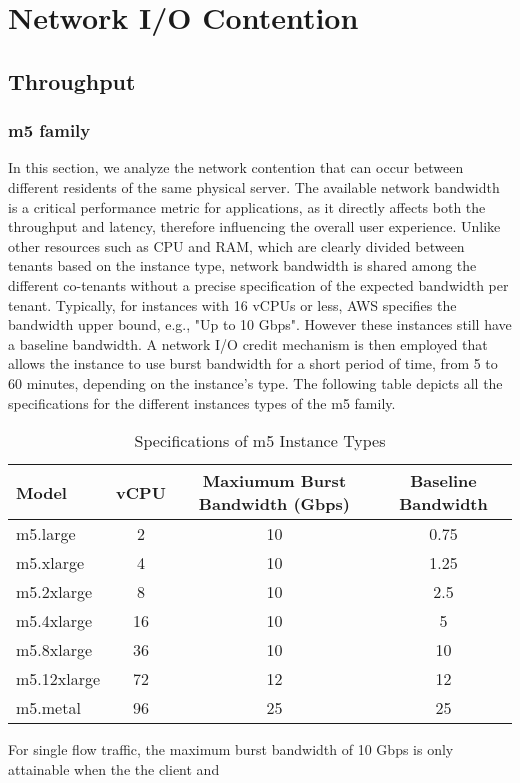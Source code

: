 \chapter{Network I/O Contention}\label{chapter:network}
\section{Throughput}
\subsection{m5 family}
In this section, we analyze the network contention that can occur between different residents of the same 
physical server. The available network bandwidth is a critical performance metric for applications, as it 
directly affects both the throughput and latency, therefore influencing the overall user experience. 
Unlike other resources such as CPU and RAM, which are clearly divided between tenants based on the instance 
type, network bandwidth is shared among the different co-tenants without a precise specification of the 
expected bandwidth per tenant. Typically, for instances with 16 vCPUs or less, AWS specifies the bandwidth 
upper bound, e.g., "Up to 10 Gbps". However these instances still have a baseline bandwidth. 
A network I/O credit mechanism is then employed that allows the instance to use burst bandwidth for a 
short period of time, from 5 to 60 minutes, depending on the instance's type. The following table 
depicts all the specifications for the different instances types of the m5 family.
\begin{table}[H]
\centering
\begin{tabular}{lccc}
\toprule
\textbf{Model} & \textbf{vCPU} & \textbf{Maxiumum Burst Bandwidth (Gbps)} & \textbf{Baseline Bandwidth} \\
\midrule
m5.large     & 2  & 10 & 0.75\\
m5.xlarge    & 4  & 10 & 1.25\\
m5.2xlarge   & 8  & 10 & 2.5\\
m5.4xlarge   & 16 & 10 & 5\\
m5.8xlarge   & 36 & 10 & 10\\
m5.12xlarge  & 72 & 12 & 12\\
m5.metal     & 96 & 25 & 25 \\
\bottomrule
\end{tabular}
\caption{Specifications of m5 Instance Types}
\end{table}
\noindent
For single flow traffic, the maximum burst bandwidth of 10 Gbps is only attainable when the the client and 
